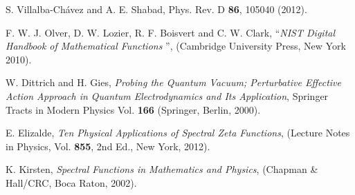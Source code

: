 \documentclass[12pt]{article}
\begin{document}
\begin{thebibliography}{99}
 S. Villalba-Ch\'{a}vez and A. E. Shabad, Phys. Rev. D 
\textbf{86}, 105040 (2012).

 F. W. J. Olver, D. W. Lozier, R. F. Boisvert and C. W. Clark,
\textquotedblleft \emph{NIST Digital Handbook of Mathematical Functions}%
\textquotedblright , (Cambridge University Press, New York 2010).

 W. Dittrich and H. Gies, \emph{Probing the Quantum
Vacuum; Perturbative Effective Action Approach in Quantum Electrodynamics
and Its Application}, Springer Tracts in Modern Physics Vol. \textbf{166}
(Springer, Berlin, 2000).

 E. Elizalde, \emph{Ten Physical Applications of Spectral
Zeta Functions}, (Lecture Notes in Physics, Vol. \textbf{855}, 2nd Ed., New
York, 2012).

 K. Kirsten, \emph{Spectral Functions in Mathematics and
Physics}, (Chapman \& Hall/CRC, Boca Raton, 2002).
\end{thebibliography}
\end{document}
